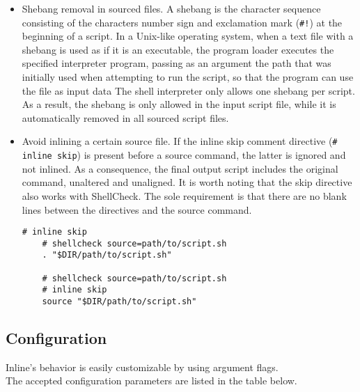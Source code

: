 \begin{itemize}
  \item Shebang removal in sourced files.
    \newline
    A shebang is the character sequence consisting of the characters number sign
    and exclamation mark (\texttt{\#!}) at the beginning of a script. In a Unix-like
    operating system, when a text file with a shebang is used as if it is an
    executable, the program loader executes the specified interpreter program,
    passing as an argument the path that was initially used when attempting to
    run the script, so that the program can use the file as input data\cite{shebang}
    \newline
    The shell interpreter only allows one shebang per script. As a result, the
    shebang is only allowed in the input script file, while it is automatically removed
    in all sourced script files.

  \item Avoid inlining a certain source file. If the inline skip comment
    directive (\texttt{\# inline skip}) is present before a source command, the
    latter is ignored and not inlined. As a consequence, the final output script
    includes the original command, unaltered and unaligned.
    \newline
    It is worth noting that the skip directive also works with ShellCheck. The sole
    requirement is that there are no blank lines between the directives and the source
    command.
    \newline
    \begin{lstlisting}[language=shell, alsoletter={.}, morekeywords={[2]{.}}, numbers=none, aboveskip=0pt, belowskip=0pt, abovecaptionskip=0pt, belowcaptionskip=0pt]
    # inline skip
    # shellcheck source=path/to/script.sh
    . "$DIR/path/to/script.sh"

    # shellcheck source=path/to/script.sh
    # inline skip
    source "$DIR/path/to/script.sh"
  \end{lstlisting}
\end{itemize}

\subsection{Configuration}
\label{subsec:corollary_projects_inline_configuration}

Inline's behavior is easily customizable by using argument flags. \\ %
The accepted configuration parameters are listed in the table below.

